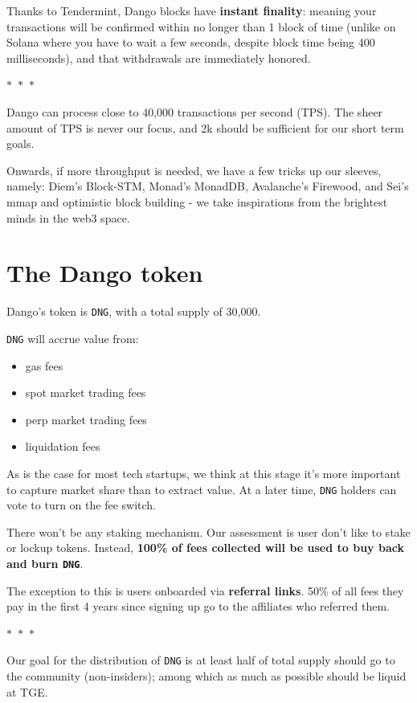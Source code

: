 \documentclass{article}
\newcommand{\separator}{%
  \begin{center}
    $\ast$~$\ast$~$\ast$
  \end{center}
}
\newcommand{\image}[2]{%
  \begin{center}
    \makebox[\textwidth]{ \texttt{[image: \#1]}}%
  \end{center}
  \begin{center}
    \captionsetup{type=figure}
    \captionof{figure}{#2}
  \end{center}
}
\begin{document}
Thanks to Tendermint, Dango blocks have \textbf{instant finality}: meaning your transactions will be confirmed within no longer than 1 block of time (unlike on Solana where you have to wait a few seconds, despite block time being 400 milliseconds), and that withdrawals are immediately honored.

\separator

Dango can process close to 40,000 transactions per second (TPS). The sheer amount of TPS is never our focus, and 2k should be sufficient for our short term goals.

Onwards, if more throughput is needed, we have a few tricks up our sleeves, namely: Diem's Block-STM, Monad's MonadDB, Avalanche's Firewood, and Sei's mmap and optimistic block building - we take inspirations from the brightest minds in the web3 space.

\section{The Dango token}

Dango's token is \texttt{DNG}, with a total supply of 30,000.

\image{images/9-dango-token.jpeg}{Dango token}

\texttt{DNG} will accrue value from:

\begin{itemize}
  \item gas fees
  \item spot market trading fees
  \item perp market trading fees
  \item liquidation fees
\end{itemize}

As is the case for most tech startups, we think at this stage it's more important to capture market share than to extract value. At a later time, \texttt{DNG} holders can vote to turn on the fee switch.

There won't be any staking mechanism. Our assessment is user don't like to stake or lockup tokens. Instead, \textbf{100\% of fees collected will be used to buy back and burn \texttt{DNG}}.

The exception to this is users onboarded via \textbf{referral links}. 50\% of all fees they pay in the first 4 years since signing up go to the affiliates who referred them.

\separator

Our goal for the distribution of \texttt{DNG} is at least half of total supply should go to the community (non-insiders); among which as much as possible should be liquid at TGE.
\end{document}
